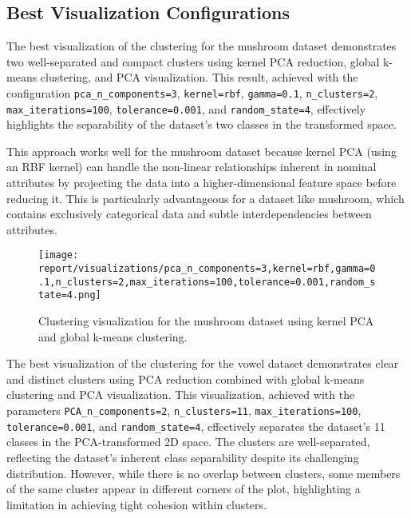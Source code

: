\subsection{Best Visualization Configurations}
\label{subsec:best-visualization-configs}

The best visualization of the clustering for the mushroom dataset demonstrates two well-separated and compact clusters using kernel PCA reduction, global k-means clustering, and PCA visualization. This result, achieved with the configuration \texttt{pca\_n\_components=3}, \texttt{kernel=rbf}, \texttt{gamma=0.1}, \texttt{n\_clusters=2}, \texttt{max\_iterations=100}, \texttt{tolerance=0.001}, and \texttt{random\_state=4}, effectively highlights the separability of the dataset's two classes in the transformed space.

This approach works well for the mushroom dataset because kernel PCA (using an RBF kernel) can handle the non-linear relationships inherent in nominal attributes by projecting the data into a higher-dimensional feature space before reducing it. This is particularly advantageous for a dataset like mushroom, which contains exclusively categorical data and subtle interdependencies between attributes.

\begin{figure}[h!]
    \centering
    \texttt{[image: report/visualizations/pca\_n\_components=3,kernel=rbf,gamma=0.1,n\_clusters=2,max\_iterations=100,tolerance=0.001,random\_state=4.png]}
    \caption{Clustering visualization for the mushroom dataset using kernel PCA and global k-means clustering.}
    \label{fig:mushroom_clustering}
\end{figure}

The best visualization of the clustering for the vowel dataset demonstrates clear and distinct clusters using PCA reduction combined with global k-means clustering and PCA visualization. This visualization, achieved with the parameters \texttt{PCA\_n\_components=2}, \texttt{n\_clusters=11}, \texttt{max\_iterations=100}, \texttt{tolerance=0.001}, and \texttt{random\_state=4}, effectively separates the dataset's 11 classes in the PCA-transformed 2D space. The clusters are well-separated, reflecting the dataset's inherent class separability despite its challenging distribution. However, while there is no overlap between clusters, some members of the same cluster appear in different corners of the plot, highlighting a limitation in achieving tight cohesion within clusters.

